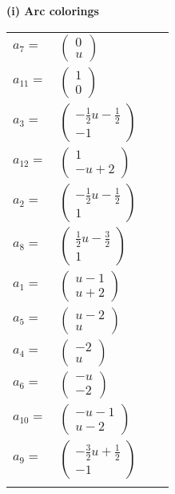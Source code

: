 \documentclass[1p]{elsarticle_modified}
\theoremstyle{definition}
\begin{document}
\flushleft \textbf{(i) Arc colorings}\\
\begin{tabular}{m{7pt} m{180pt} m{7pt} m{180pt} }
\flushright $a_{7}=$&$\begin{pmatrix}0\\u\end{pmatrix}$ \\
\flushright $a_{11}=$&$\begin{pmatrix}1\\0\end{pmatrix}$ \\
\flushright $a_{3}=$&$\begin{pmatrix}-\frac{1}{2} u-\frac{1}{2}\\-1\end{pmatrix}$ \\
\flushright $a_{12}=$&$\begin{pmatrix}1\\- u+2\end{pmatrix}$ \\
\flushright $a_{2}=$&$\begin{pmatrix}-\frac{1}{2} u-\frac{1}{2}\\1\end{pmatrix}$ \\
\flushright $a_{8}=$&$\begin{pmatrix}\frac{1}{2} u-\frac{3}{2}\\1\end{pmatrix}$ \\
\flushright $a_{1}=$&$\begin{pmatrix}u-1\\u+2\end{pmatrix}$ \\
\flushright $a_{5}=$&$\begin{pmatrix}u-2\\u\end{pmatrix}$ \\
\flushright $a_{4}=$&$\begin{pmatrix}-2\\u\end{pmatrix}$ \\
\flushright $a_{6}=$&$\begin{pmatrix}- u\\-2\end{pmatrix}$ \\
\flushright $a_{10}=$&$\begin{pmatrix}- u-1\\u-2\end{pmatrix}$ \\
\flushright $a_{9}=$&$\begin{pmatrix}-\frac{3}{2} u+\frac{1}{2}\\-1\end{pmatrix}$\\&\end{tabular}
\end{document}

